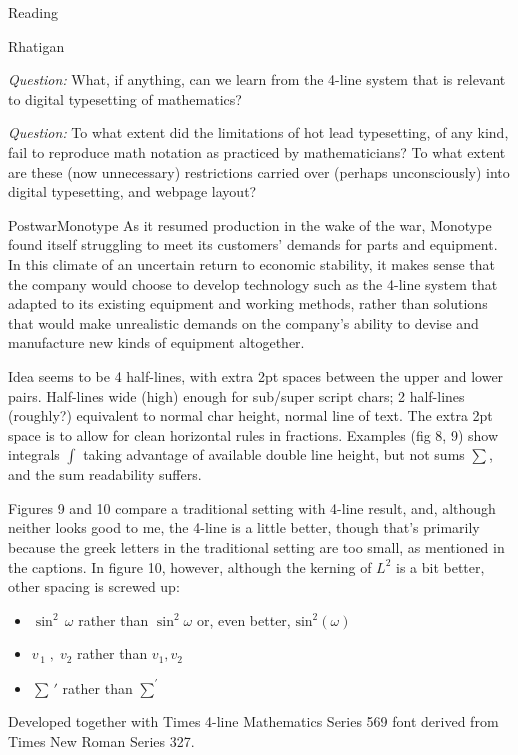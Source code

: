 \documentclass[11pt]{PalisadesLakesBook}
\begin{document}
\begin{plSection}{Reading}
\begin{plSection}{Rhatigan}
\begin{plSection}{}
\emph{Question:} What, if anything, can we learn from the
4-line system that is relevant to digital typesetting
of mathematics?

\emph{Question:} To what extent did the limitations of
hot lead typesetting, of any kind, 
fail to reproduce math notation as practiced by mathematicians?
To what extent are these (now unnecessary) restrictions
carried over (perhaps unconsciously) into digital typesetting,
and webpage layout?

\begin{plQuote}
{}
{PostwarMonotype}
As it resumed production in the wake of the war,
Monotype found itself struggling to meet its customers'
demands for parts and equipment. 
In this climate of an uncertain return to economic stability,
it makes sense that the company would choose to develop
technology such as the 4-line system that adapted to its existing
equipment and working methods, 
rather than solutions that would make unrealistic demands
on the company's ability to devise and manufacture 
new kinds of equipment altogether. 
\end{plQuote}

Idea seems to be 4 half-lines, with extra 2pt spaces between the 
upper and lower pairs.
Half-lines wide (high) enough for sub/super script chars;
2 half-lines (roughly?) equivalent to normal char height, 
normal line of text.
The extra 2pt space is to allow for clean horizontal rules in
fractions.
Examples (fig 8, 9) show integrals $\int$ 
taking advantage of 
available double line height, but not sums $\sum$,
and the sum readability suffers.

Figures 9 and 10 compare a traditional setting with 4-line result,
and, although neither looks good to me,
the 4-line is a little better,
though that's primarily because the greek letters 
in the traditional setting are too small,
as mentioned in the captions.
In figure 10, however, although the kerning of 
$L^2$ is a bit better, other spacing is screwed up:
\begin{itemize}
\item $\sin^2 \,\omega$ rather than $\sin^{2}\!\omega$ or, even better, 
 $\textrm{sin}^{2}\!\left(\omega\right)$
\item $v_{\,1}\;,\;v_{2}$ rather than $v_{1},v_{2}$
\item $\sum\,'$ rather than $\sum^{'}$
\end{itemize}

Developed together with Times 4-line Mathematics Series 569 font
derived from Times New Roman Series 327. 


\end{plSection}
\end{plSection}
\end{plSection}
\end{document}
